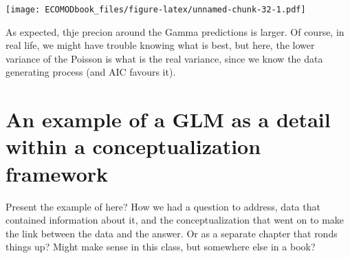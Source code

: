 \documentclass[
]{book}
\newenvironment{Shaded}{\begin{snugshade}}{\end{snugshade}}
\newcommand{\AttributeTok}[1]{\textcolor[rgb]{0.13,0.29,0.53}{#1}}
\newcommand{\DecValTok}[1]{\textcolor[rgb]{0.00,0.00,0.81}{#1}}
\newcommand{\FloatTok}[1]{\textcolor[rgb]{0.00,0.00,0.81}{#1}}
\newcommand{\FunctionTok}[1]{\textcolor[rgb]{0.13,0.29,0.53}{\textbf{#1}}}
\newcommand{\NormalTok}[1]{#1}
\newcommand{\SpecialCharTok}[1]{\textcolor[rgb]{0.81,0.36,0.00}{\textbf{#1}}}
\newcommand{\StringTok}[1]{\textcolor[rgb]{0.31,0.60,0.02}{#1}}
\begin{document}
\begin{Shaded}
\end{Shaded}

\texttt{[image: ECOMODbook\_files/figure-latex/unnamed-chunk-32-1.pdf]}

As expected, thje precion around the Gamma predictions is larger. Of course, in real life, we might have trouble knowing what is best, but here, the lower variance of the Poisson is what is the real variance, since we know the data generating process (and AIC favours it).

\hypertarget{an-example-of-a-glm-as-a-detail-within-a-conceptualization-framework}{%
\section{An example of a GLM as a detail within a conceptualization framework}\label{an-example-of-a-glm-as-a-detail-within-a-conceptualization-framework}}

Present the example of \citet{Filipe2004} here? How we had a question to address, data that contained information about it, and the conceptualization that went on to make the link between the data and the answer. Or as a separate chapter that ronds things up? Might make sense in this class, but somewhere else in a book?
\end{document}
